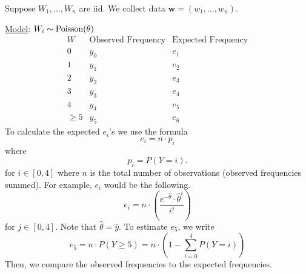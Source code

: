 \begin{exbox}
    \begin{example}
        Suppose $ W_1,\ldots ,W_n $ are iid. We collect data $ \bm{w}=(w_1,\ldots ,w_n) $.

        \underline{Model}: $ W_i \thicksim \operatorname{Poisson}(\theta) $
        \[
            \begin{array}{c|c|c|}
                W           & \text{Observed Frequency} & \text{Expected Frequency} \\
                \hline
                0           & y_0                       & e_1                       \\
                1           & y_1                       & e_2                       \\
                2           & y_2                       & e_3                       \\
                3           & y_3                       & e_4                       \\
                4           & y_4                       & e_5                       \\
                \geqslant 5 & y_5                       & e_6
            \end{array}
        \]
        To calculate the expected $ e_i $'s we use the formula
        \[ e_i=n\cdot p_i \]
        where
        \[ p_i=P(Y=i). \]
        for $ i\in[0,4] $ where $ n $ is the total number of observations (observed frequencies summed).
        For example, $ e_i $ would be the following.
        \[ e_i=n\cdot \left( \frac{e^{-\hat{\theta}}\cdot\hat{\theta}^{i}}{i!} \right) \]
        for $ j\in[0,4] $. Note that $ \hat{\theta}=\bar{y} $.
        To estimate $ e_5 $, we write
        \[ e_5=n\cdot P(Y\geqslant 5)=n\cdot \left( 1-\sum\limits_{i=0}^{4}P(Y=i) \right) \]
        Then, we compare the observed frequencies to the expected frequencies.
    \end{example}
\end{exbox}
